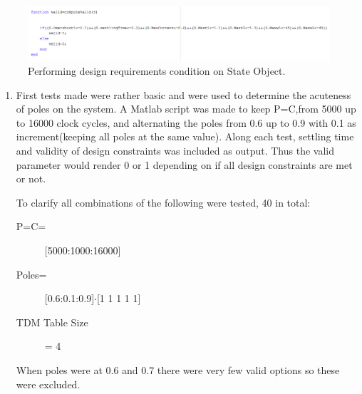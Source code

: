 \begin{figure}[h!]
	\begin{center}
		\includegraphics[width=1.1\linewidth]{img/valid}
		\caption{Performing design requirements condition on State Object.}
		\label{fig:valid}
	\end{center}
\end{figure}



\begin{enumerate}
	\item First tests made were rather basic and were used to determine the acuteness of poles on the system. A Matlab script was made to keep P=C,from 5000 up to 16000 clock cycles, and alternating the poles from 0.6 up to 0.9 with 0.1 as increment(keeping all poles at the same value). Along each test, settling time and validity of design constraints was included as output. Thus the valid parameter would render 0 or 1 depending on if all design constraints are met or not.
	
	To clarify all combinations of the following were tested, 40 in total:
	\begin{description}
		\item[P=C=] [5000:1000:16000]
		\item[Poles=] [0.6:0.1:0.9]$\cdot$[1 1 1 1 1]
		\item[TDM Table Size] = 4
	\end{description}
	When poles were at 0.6 and 0.7 there were very few valid options so these were excluded.
	

\end{enumerate}
